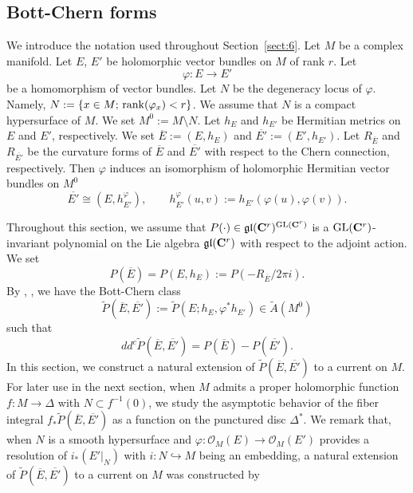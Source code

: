 \documentclass[amscd, leqno]{amsart}
\theoremstyle{plain}
\theoremstyle{definition}
\theoremstyle{remark}
\begin{document}
\subsection
{Bott-Chern forms}
\label{sect:6.1}
\par
We introduce the notation used throughout Section~\ref{sect:6}.
Let $M$ be a complex manifold. 
Let $E$, $E'$ be holomorphic vector bundles on $M$ of rank $r$. Let 
$$
\varphi \colon E \to E'
$$ 
be a homomorphism of vector bundles. Let $N$ be the degeneracy locus of $\varphi$. 
Namely, $N:= \{ x \in M; \, {\rm rank}(\varphi_{x}) < r \}$. We assume that $N$ is a compact hypersurface of $M$. 
We set $M^{0} := M\setminus N$. 
Let $h_{E}$ and $h_{E'}$ be Hermitian metrics on $E$ and $E'$, respectively. 
We set $\overline{E}:=(E,h_{E})$ and $\overline{E'}:=(E',h_{E'})$.
Let $R_{\overline{E}}$ and $R_{\overline{E'}}$ be the curvature forms of $\overline{E}$ and $\overline{E'}$ 
with respect to the Chern connection, respectively.
Then $\varphi$ induces an isomorphism of holomorphic Hermitian vector bundles on $M^{0}$
$$
\overline{E'} \cong (E, h_{E'}^{\varphi}),
\qquad
h_{E'}^{\varphi}(u,v) := h_{E'}(\varphi(u),\varphi(v)).
$$
\par
Throughout this section, we assume that
$P(\cdot)\in\frak{gl}({\bf C}^{r})^{{\rm GL}({\bf C}^{r})}$ is a ${\rm GL}({\mathbf C}^{r})$-invariant polynomial 
on the Lie algebra $\frak{gl}({\bf C}^{r})$ 
with respect to the adjoint action. We set 
$$
P(\overline{E}) = P(E,h_{E}) := P\left(-R_{\overline{E}}/2\pi i\right).
$$
By \cite[I, e), f)]{BGS88}, \cite[Sect.1.2.4]{GilletSoule90}, we have the Bott-Chern class 
$$
\widetilde{P}(\overline{E},\overline{E'}) := \widetilde{P}(E ; h_{E}, \varphi^{*}h_{E'})\in\widetilde{A}(M^{0})
$$ 
such that 
$$
dd^{c}\widetilde{P}(\overline{E},\overline{E'}) = P(\overline{E}) - P(\overline{E'}).
$$
In this section, we construct a natural extension of $\widetilde{P}(\overline{E},\overline{E'})$ to a current on $M$. 
For later use in the next section, when $M$ admits a proper holomorphic function $f \colon M \to \varDelta$ with $N \subset f^{-1}(0)$, 
we study the asymptotic behavior of the fiber integral
$f_{*}\widetilde{P}(\overline{E},\overline{E'})$ as a function on the punctured disc $\varDelta^{*}$.
We remark that, when $N$ is a smooth hypersurface and $\varphi \colon {\mathcal O}_{M}(E) \to {\mathcal O}_{M}(E')$ provides 
a resolution of $i_{*}(E'|_{N})$ with $i \colon N \hookrightarrow M$ being an embedding, 
a natural extension of $\widetilde{P}(\overline{E},\overline{E'})$ to a current on $M$ was constructed by 
\end{document}
